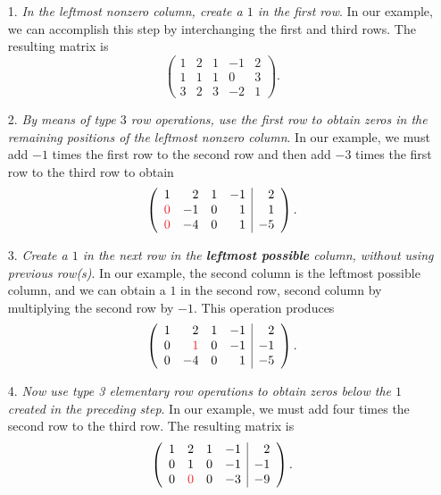 \begin{remark}
\begin{enumerate}
\item[1.] \emph{In the leftmost nonzero column, create a \(1\) in the first row}.
    In our example, we can accomplish this step by interchanging the first and third rows.
    The resulting matrix is
    \[
        \left(\begin{array}{rrrr|r}
            1 & 2 & 1 & -1 & 2 \\
            1 & 1 & 1 & 0 & 3 \\
            3 & 2 & 3 & -2 & 1
        \end{array}\right).
    \]
\item[2.] \emph{By means of type \(3\) row operations, use the first row to obtain zeros in the remaining positions of the leftmost nonzero column}.
    In our example, we must add \(-1\) times the first row to the second row and then add \(-3\) times the first row to the third row to obtain
    \[
        \left(\begin{array}{rrrr|r}
            1 & 2 & 1 & -1 & 2 \\
            \RED{0} & -1 & 0 & 1 & 1 \\
            \RED{0} & -4 & 0 & 1 & -5
        \end{array}\right).
    \]
\item[3.] \emph{Create a \(1\) in the next row in the \textbf{leftmost possible} column, without using previous row(s)}.
    In our example, the second column is the leftmost possible column, and we can obtain a \(1\) in the second row, second column by multiplying the second row by \(-1\).
    This operation produces
    \[
        \left(\begin{array}{rrrr|r}
            1 & 2 & 1 & -1 & 2 \\
            0 & \RED{1} & 0 & -1 & -1 \\
            0 & -4 & 0 & 1 & -5
        \end{array}\right).
    \]
\item[4.] \emph{Now use type 3 elementary row operations to obtain zeros below the \(1\) created in the preceding step}.
    In our example, we must add four times the second row to the third row.
    The resulting matrix is
    \[
        \left(\begin{array}{rrrr|r}
            1 & 2 & 1 & -1 & 2 \\
            0 & 1 & 0 & -1 & -1 \\
            0 & \RED{0} & 0 & -3 & -9
        \end{array}\right).
\]
\end{enumerate}
\end{remark}
